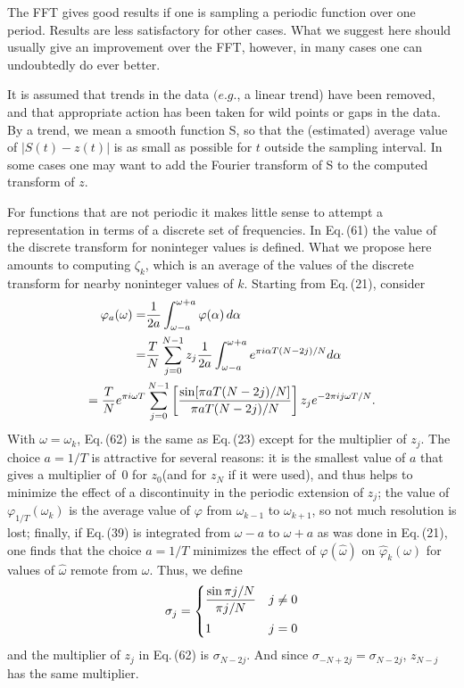 \documentclass[twoside]{MATH77}
\begin{document}
The FFT gives good results if one is sampling a periodic function over one
period. Results are less satisfactory for other cases. What we suggest here
should usually give an improvement over the FFT, however, in many cases one
can undoubtedly do ever better.

It is assumed that trends in the data $(e.g.$, a linear trend) have been
removed, and that appropriate action has been taken for wild points or gaps
in the data. By a trend, we mean a smooth function S, so that the
(estimated) average value of $|S(t)-z(t)|$ is as small as possible for $t$
outside the sampling interval. In some cases one may want to add the Fourier
transform of S to the computed transform of $z$.

For functions that are not periodic it makes little sense to attempt a
representation in terms of a discrete set of frequencies. In Eq.\,(61) the
value of the discrete transform for noninteger values is defined. What we
propose here amounts to computing $\zeta _k$, which is an average of the
values of the discrete transform for nearby noninteger values of $k$.
Starting from Eq.\,(21), consider
\begin{align}
\varphi _a(\omega )=&\frac 1{2a}\int_{\omega -a}^{\omega
+a}\varphi (\alpha )\,d\alpha \vspace{4pt}\notag \\
=&\frac TN\sum_{j=0}^{N-1}z_j\frac
1{2a}\int_{\omega -a}^{\omega +a}e^{\pi i\alpha T(N-2j)/N}d\alpha
\vspace{4pt}\notag \\
=\frac TNe^{\pi i\omega T}&\sum_{j=0}^{N-1}\left[
\frac{\sin [\pi aT(N-2j)/N]}{\pi aT(N-2j)/N}\right]
z_je^{-2\pi ij\omega T/N}.\label{O62}
\end{align}
With $\omega =\omega _k$, Eq.\,(62) is the same as Eq.\,(23) except
for the multiplier of $z_j$. The choice $a=1/T$ is attractive for
several reasons:  it is the smallest value of $a$ that gives a
multiplier of~0 for $z_0$(and for $z_N$ if it were used), and thus
helps to minimize the effect of a discontinuity in the periodic
extension of $z_j$; the value of $\varphi _{1/T}(\omega _k)$ is the
average value of $\varphi $ from $\omega _{k-1}$ to $\omega
_{k+1}$, so not much resolution is lost; finally, if Eq.\,(39) is
integrated from $\omega -a$ to $\omega +a$ as was done in Eq.\,(21),
one finds that the choice $a=1/T$ minimizes the effect of $\varphi
(\hat \omega )$ on $\hat \varphi _k(\omega )$ for values of $\hat
\omega $ remote from $\omega $. Thus, we define
\begin{equation}\label{O63}
\sigma _j=\begin{cases}
\dfrac{\sin \pi j/N}{\pi j/N}\vspace{4pt} & j\neq 0\\
1 & j=0
\end{cases}
\end{equation}
and the multiplier of $z_j$ in Eq.\,(62) is $\sigma _{N-2j}$. And since
$\sigma _{-N+2j}=\sigma _{N-2j}$, $z_{N-j}$ has the same multiplier.
\end{document}
